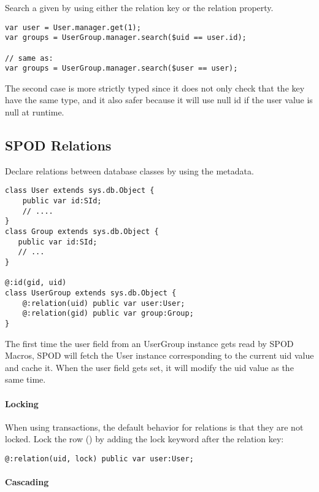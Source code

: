 Search a given  by using either the relation key or the relation property.

\begin{lstlisting} 
var user = User.manager.get(1);
var groups = UserGroup.manager.search($uid == user.id);

// same as:
var groups = UserGroup.manager.search($user == user);
\end{lstlisting} 
The second case is more strictly typed since it does not only check that the key have the same type, and it also safer because it will use null id if the user value is null at runtime.

\subsection{SPOD Relations}
\label{std-spod-relations}

Declare relations between database classes by using the  metadata.

\begin{lstlisting} 
class User extends sys.db.Object {
    public var id:SId;
    // ....
}
class Group extends sys.db.Object {
   public var id:SId;
   // ...
}

@:id(gid, uid)
class UserGroup extends sys.db.Object {
    @:relation(uid) public var user:User;
    @:relation(gid) public var group:Group;
}
\end{lstlisting} 

The first time the user field from an UserGroup instance gets read by SPOD Macros, SPOD will fetch the User instance corresponding to the current uid value and cache it. When the user field gets set, it will modify the uid value as the same time.

\paragraph{Locking}
When using transactions, the default behavior for relations is that they are not locked. Lock the row () by adding the lock keyword after the relation key:

\begin{lstlisting} 
@:relation(uid, lock) public var user:User;
\end{lstlisting} 

\paragraph{Cascading}

